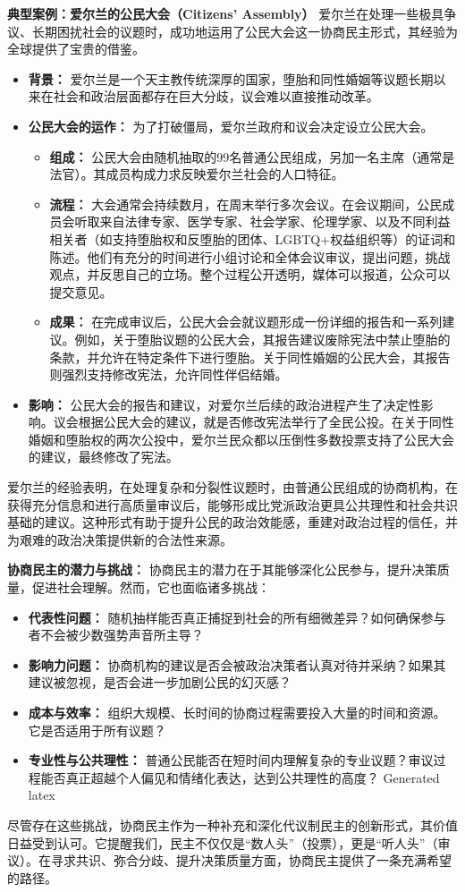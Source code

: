 \documentclass[UTF8, 10pt]{ctexbook}
\begin{document}
\textbf{典型案例：爱尔兰的公民大会（Citizens' Assembly）}
爱尔兰在处理一些极具争议、长期困扰社会的议题时，成功地运用了公民大会这一协商民主形式，其经验为全球提供了宝贵的借鉴。
\begin{itemize}
    \item \textbf{背景：} 爱尔兰是一个天主教传统深厚的国家，堕胎和同性婚姻等议题长期以来在社会和政治层面都存在巨大分歧，议会难以直接推动改革。
    \item \textbf{公民大会的运作：} 为了打破僵局，爱尔兰政府和议会决定设立公民大会。
        \begin{itemize}
            \item \textbf{组成：} 公民大会由随机抽取的99名普通公民组成，另加一名主席（通常是法官）。其成员构成力求反映爱尔兰社会的人口特征。
            \item \textbf{流程：} 大会通常会持续数月，在周末举行多次会议。在会议期间，公民成员会听取来自法律专家、医学专家、社会学家、伦理学家、以及不同利益相关者（如支持堕胎权和反堕胎的团体、LGBTQ+权益组织等）的证词和陈述。他们有充分的时间进行小组讨论和全体会议审议，提出问题，挑战观点，并反思自己的立场。整个过程公开透明，媒体可以报道，公众可以提交意见。
            \item \textbf{成果：} 在完成审议后，公民大会会就议题形成一份详细的报告和一系列建议。例如，关于堕胎议题的公民大会，其报告建议废除宪法中禁止堕胎的条款，并允许在特定条件下进行堕胎。关于同性婚姻的公民大会，其报告则强烈支持修改宪法，允许同性伴侣结婚。
        \end{itemize}
    \item \textbf{影响：} 公民大会的报告和建议，对爱尔兰后续的政治进程产生了决定性影响。议会根据公民大会的建议，就是否修改宪法举行了全民公投。在关于同性婚姻和堕胎权的两次公投中，爱尔兰民众都以压倒性多数投票支持了公民大会的建议，最终修改了宪法。
\end{itemize}
爱尔兰的经验表明，在处理复杂和分裂性议题时，由普通公民组成的协商机构，在获得充分信息和进行高质量审议后，能够形成比党派政治更具公共理性和社会共识基础的建议。这种形式有助于提升公民的政治效能感，重建对政治过程的信任，并为艰难的政治决策提供新的合法性来源。

\textbf{协商民主的潜力与挑战：}
协商民主的潜力在于其能够深化公民参与，提升决策质量，促进社会理解。然而，它也面临诸多挑战：
\begin{itemize}
    \item \textbf{代表性问题：} 随机抽样能否真正捕捉到社会的所有细微差异？如何确保参与者不会被少数强势声音所主导？
    \item \textbf{影响力问题：} 协商机构的建议是否会被政治决策者认真对待并采纳？如果其建议被忽视，是否会进一步加剧公民的幻灭感？
    \item \textbf{成本与效率：} 组织大规模、长时间的协商过程需要投入大量的时间和资源。它是否适用于所有议题？
    \item \textbf{专业性与公共理性：} 普通公民能否在短时间内理解复杂的专业议题？审议过程能否真正超越个人偏见和情绪化表达，达到公共理性的高度？
Generated latex
\end{itemize}
尽管存在这些挑战，协商民主作为一种补充和深化代议制民主的创新形式，其价值日益受到认可。它提醒我们，民主不仅仅是“数人头”（投票），更是“听人头”（审议）。在寻求共识、弥合分歧、提升决策质量方面，协商民主提供了一条充满希望的路径。
\end{document}

